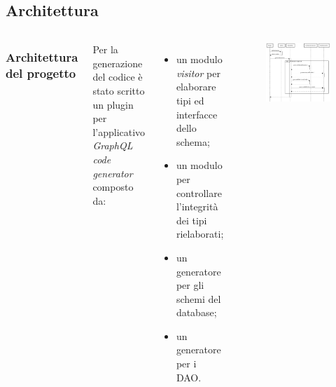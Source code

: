 \documentclass[c]{beamer}
\begin{document}
        \subsection{Architettura}
            \begin{frame}
                \begin{columns}
                    \frametitle{Architettura del progetto}
                        Per la generazione del codice è stato scritto un plugin per l'applicativo \emph{GraphQL code generator} composto da:
                        \begin{itemize}
                            \item un modulo \emph{visitor} per elaborare tipi ed interfacce dello schema;
                            \item un modulo per controllare l'integrità dei tipi rielaborati;
                            \item un generatore per gli schemi del database;
                            \item un generatore per i DAO.
                        \end{itemize}
                        \begin{figure}
                            \includegraphics[scale=0.2]{../generator_workflow.png}
                        \end{figure}
                \end{columns}
            \end{frame}
\end{document}
